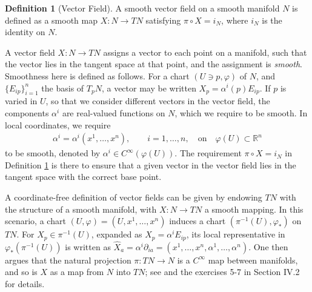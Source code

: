 \documentclass[psamsfonts]{amsart}
\theoremstyle{definition}
\newtheorem{defn}[thm]{Definition}
\theoremstyle{remark}
\newcommand*\R{\mathds{R}}
\numberwithin{equation}{section}
\begin{document}
\begin{defn}[Vector Field]\label{def:vectorfield}
A smooth vector field on a smooth manifold $N$ is defined as a smooth map $X:N\rightarrow TN$ satisfying $\pi \circ X = i_N$, where $i_N$ is the identity on $N$. 
\end{defn}
A vector field $X: N \rightarrow TN$ assigns a vector to each point on a manifold, such that the vector lies in the tangent space at that point, and the assignment is \textit{smooth}. Smoothness here is defined as follows. For a chart $(U\ni p, \varphi)$ of $N$, and $\{E_{ip}\}_{i = 1}^n$ the basis of $T_pN$, a vector may be written $X_p = \alpha^i(p) E_{ip}$. If $p$ is varied in $U$, so that we consider different vectors in the vector field, the components $\alpha^i$ are real-valued functions on $N$, which we require to be smooth. In local coordinates, we require 
\begin{equation}\label{eq:vectorfieldcoeff}
\begin{aligned}
\alpha^i = \alpha^i(x^1, \dots, x^n), \qquad i = 1, \dots, n, \quad \text{on}\quad \varphi(U)\subset \R^n
\end{aligned}
\end{equation} 
to be smooth, denoted by $\alpha^i \in C^{\infty}(\varphi(U))$. The requirement $\pi \circ X = i_N$ in Definition \ref{def:vectorfield} is there to ensure that a given vector in the vector field lies in the tangent space with the correct base point.%

A coordinate-free definition of vector fields can be given by endowing $TN$ with the structure of a smooth manifold, with $X:N\rightarrow TN$ a smooth mapping. In this scenario, a chart $(U, \varphi) = (U, x^1, \dots, x^n)$ induces a chart $(\pi^{-1}(U), \varphi_*)$ on $TN$. For $X_p\in \pi^{-1}(U)$, expanded as $X_p = \alpha^i E_{ip}$, its local representative in $\varphi_*(\pi^{-1}(U))$ is written as $\hat X_a = \alpha^i \partial_{ia} = (x^1, \dots, x^n, \alpha^1, \dots, \alpha^n)$. One then argues that the natural projection $\pi:TN\rightarrow N$ is a $C^{\infty}$ map between manifolds, and so is $X$ as a map from $N$ into $TN$; see \cite{nijmeijer_nonlinear_1990} and the exercises 5-7 in \cite{boothby_2002} Section IV.2 for details. 
\end{document}
